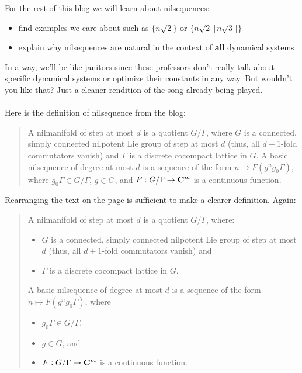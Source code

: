 \documentclass[12pt]{article}
\begin{document}
\newpage

\noindent For the rest of this blog we will learn about nilsequences:
\begin{itemize}
\item find examples we care about such as $\{ n \sqrt{2}\}$ or $ \{ n \sqrt{2} \, \lfloor n \sqrt{3}\rfloor \} $
\item explain why nilsequences are natural in the context of \textbf{all} dynamical systems
\end{itemize}
In a way, we'll be like janitors since these professors don't really talk about specific dynamical systems or optimize their constants in any way.  But wouldn't you like that?  Just a cleaner rendition of the song already being played. \\ \\
Here is the definition of nilsequence from the blog:
\begin{quotation}
\noindent A nilmanifold of step at most ${d}$ is a quotient ${G/\Gamma}$, where ${G}$ is a connected, simply connected nilpotent Lie group of step at most ${d}$ (thus, all ${d+1}$-fold commutators vanish) and ${\Gamma}$ is a discrete cocompact lattice in ${G}$. A basic nilsequence of degree at most ${d}$ is a sequence of the form ${n \mapsto F(g^n g_0 \Gamma)}$, where ${g_0 \Gamma \in G/\Gamma}$, ${g \in G}$, and ${F: G/\Gamma \rightarrow {\bf C}^m}$ is a continuous function.
\end{quotation}
Rearranging the text on the page is sufficient to make a clearer definition.  Again:
\begin{quotation}
\noindent A nilmanifold of step at most ${d}$ is a quotient ${G/\Gamma}$, where:
\begin{itemize}
\item ${G}$ is a connected, simply connected nilpotent Lie group of step at most ${d}$ (thus, all ${d+1}$-fold commutators vanish) and 
\item ${\Gamma}$ is a discrete cocompact lattice in ${G}$.
\end{itemize}
A basic nilsequence of degree at most ${d}$ is a sequence of the form ${n \mapsto F(g^n g_0 \Gamma)}$, where 
\begin{itemize}
\item ${g_0 \Gamma \in G/\Gamma}$, 
\item ${g \in G}$, and 
\item ${F: G/\Gamma \rightarrow {\bf C}^m}$ is a continuous function.
\end{itemize}
\end{quotation}
\end{document}
